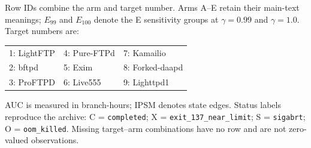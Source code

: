 \begingroup
\small
\setlength{\tabcolsep}{1.8pt}
\renewcommand{\arraystretch}{1.00}
\noindent Row IDs combine the arm and target number. Arms A--E retain their main-text meanings; $E_{99}$ and $E_{100}$ denote the E sensitivity groups at $\gamma=0.99$ and $\gamma=1.0$. Target numbers are:
\par\smallskip
\noindent\begin{tabularx}{\columnwidth}{@{}YYY@{}}
1: LightFTP & 4: Pure-FTPd & 7: Kamailio \\
2: bftpd & 5: Exim & 8: Forked-daapd \\
3: ProFTPD & 6: Live555 & 9: Lighttpd1 \\
\end{tabularx}
\par\smallskip
\noindent AUC is measured in branch-hours; IPSM denotes state edges. Status labels reproduce the archive: C = \texttt{completed}; X = \texttt{exit\_137\_near\_limit}; S = \texttt{sigabrt}; O = \texttt{oom\_killed}. Missing target--arm combinations have no row and are not zero-valued observations.
\par\smallskip
